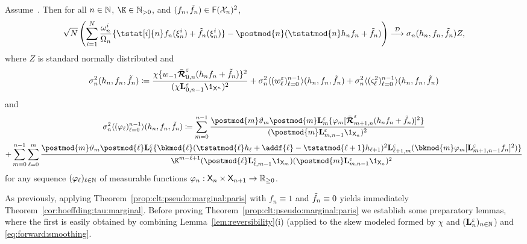 \begin{theorem}
\label{prop:clt:pseudo:marginal:paris}
Assume~. Then for all $n \in \mathbb{N}$, $\K \in \nsetpos$, and $(f_n, \tilde{f}_{n}) \in \mathsf{F}(\mathcal{X}_n)^2$,
$$
 \sqrt{\N} \left( \sum_{i = 1}^\N \frac{\ewght{n}{i}}{\sumwght{n}} \{\tstat[i]{n} f_n(\epart{n}{i}) + \ftd{n}(\epart{n}{i}) \} - \postmod{n}(\tstatmod{n} h_n f_n + \ftd{n}) \right) 
  \dlim \sigma_n(h_n, f_n, \ftd{n}) Z,
$$
where $Z$ is standard normally distributed and 
\begin{equation} \label{eq:non-recursive:as:var:affine}
\sigma^2_n (h_n, f_n, \ftd{n}) \eqdef \frac{\chi \{ \initwgtfunc
\retrokmodmodnorm_{0, n} (h_n f_n + \ftd{n}) \}^2}{(\chi \ukmod{0, n - 1} \1_{\Xset^n})^2} 
+ \sigma^2_n \langle (\wgtfuncmod{\ell})_{\ell = 0}^{n - 1} \rangle (h_n, f_n, \ftd{n}) 
+ \sigma^2_n \langle (\ukestvar{\ell})_{\ell = 0}^{n - 1} \rangle (h_n, f_n, \ftd{n}) 
\end{equation}
and
\begin{multline} \label{eq:partial:variance}
\sigma^2_n \langle (\varphi_\ell)_{\ell = 0}^{n - 1} \rangle (h_n, f_n, \ftd{n}) 
\eqdef \sum_{m = 0}^{n - 1} \frac{\postmod{m} \adjfuncforward{m} \postmod{m} \ukmod{m} \{ \varphi_m [\retrokmodmodnorm_{m + 1, n} (h_n f_n + \ftd{n})]^2
\}}{(\postmod{m} \ukmod{m, n - 1} \1_{\Xset_n})^2} \\
+ \sum_{m = 0}^{n - 1} \sum_{\ell = 0}^m \frac{\postmod{m} \adjfuncforward{m} \postmod{\ell} \ukmod{\ell} \{\bkmod{\ell}(\tstatmod{\ell} h_{\ell} + \addf{\ell} - \tstatmod{\ell + 1} h_{\ell +1})^2 \ukmod{\ell + 1, m}( \bkmod{m} \varphi_m [\ukmod{m + 1, n - 1} f_n]^2
)\}}{\K^{m - \ell + 1} (\postmod{\ell} \ukmod{\ell, m - 1} \1_{\Xset_m})(\postmod{m} \ukmod{m, n - 1} \1_{\Xset_n})^2}
\end{multline}
for any sequence $(\varphi_\ell)_{\ell \in \mathbb{N}}$ of measurable functions $\varphi_n : \mathsf{X}_n \times \mathsf{X}_{n + 1} \to \mathbb{R}_{\geq 0}$. 
\end{theorem}

As previously, applying Theorem~\ref{prop:clt:pseudo:marginal:paris} with $f_n \equiv 1$ and $\tilde{f}_{n} \equiv 0$ yields immediately Theorem~\ref{cor:hoeffding:tau:marginal}. Before proving Theorem~\ref{prop:clt:pseudo:marginal:paris} we establish some preparatory lemmas, where the first is easily obtained by combining Lemma~\ref{lem:reversibility}(i) (applied to the skew modeled formed by $\chi$ and $(\mathbf{L}_{n}^\varepsilon)_{n \in \mathbb{N}}$) and \eqref{eq:forward:smoothing}. 

